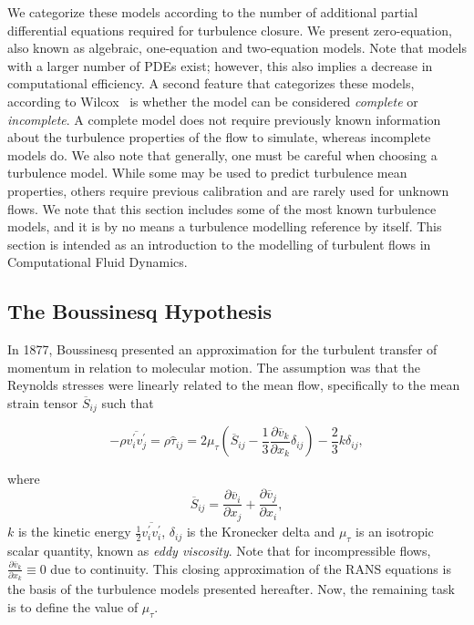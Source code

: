 We categorize these models according to the number of additional partial differential equations required for turbulence closure. We present zero-equation, also known as algebraic, one-equation and two-equation models. Note that models with a larger number of PDEs exist; however, this also implies a decrease in computational efficiency. A second feature that categorizes these models, according to Wilcox~\cite{wilcox1998turbulence} is whether the model can be considered \textit{complete} or \textit{incomplete}. A complete model does not require previously known information about the turbulence properties of the flow to simulate, whereas incomplete models do. We also note that generally, one must be careful when choosing a turbulence model. While some may be used to predict turbulence mean properties, others require previous calibration and are rarely used for unknown flows. We note that this section includes some of the most known turbulence models, and it is by no means a turbulence modelling reference by itself. This section is intended as an introduction to the modelling of turbulent flows in Computational Fluid Dynamics.


\subsection{The Boussinesq Hypothesis}

In 1877, Boussinesq presented an approximation for the turbulent transfer of momentum in relation to molecular motion. The assumption was that the Reynolds stresses were linearly related to the mean flow, specifically to the mean strain tensor $\overline S_{ij}$ such that
\begin{eqBox}
\begin{equation}
    -\rho \overline{v_i^\prime v_j^\prime} = \rho \hat \tau_{ij} =
        2 \mu_\tau \left(\overline S_{ij} - \frac{1}{3} \frac{\partial \overline v_k}{\partial x_k}\delta_{ij}
        \right) - \frac{2}{3} k \delta_{ij},
    \label{eq:boussinesq_approximation}
\end{equation}
\end{eqBox}
where
\begin{equation}
    \overline S_{ij} = 
    \frac{\partial \overline v_i}{\partial x_j} 
		+ \frac{\partial \overline v_j}{\partial x_i},
		\label{eq:meanstrainrate}
\end{equation}
$k$ is the kinetic energy $\frac{1}{2}\overline{v_i^\prime v_i^\prime}$, $\delta_{ij}$ is the Kronecker delta and $\mu_\tau$ is an isotropic scalar quantity, known as \textit{eddy viscosity}. Note that for incompressible flows, $\frac{\partial \overline v_k}{\partial x_k}\equiv0$ due to continuity. This closing approximation of the RANS equations is the basis of the turbulence models presented hereafter. Now, the remaining task is to define the value of $\mu_\tau$. 

